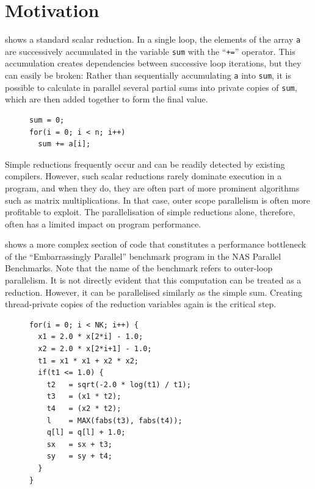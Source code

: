 \section{Motivation}

     shows a standard scalar reduction.
    In a single loop, the elements of the array \texttt{a} are successively
    accumulated in the variable \texttt{sum} with the ``\texttt{+=}'' operator.
    This accumulation creates dependencies between successive loop iterations,
    but they can easily be broken:
    Rather than sequentially accumulating {\tt a} into {\tt sum}, it is possible
    to calculate in parallel several partial sums into private copies of
    \texttt{sum}, which are then added together to form the final value.

\begin{figure}[h]
\begin{lstlisting}[language=MyCpp,label={sum-figure},caption=
    {The most conventional example of a reduction is adding up all values in an
     array.
     The reduction operator ``{\tt+}'' {\it reduces} the array \texttt{a} to a
     single element -- the reduction variable {\tt sum}.\parfillskip=0pt}]
sum = 0;
for(i = 0; i < n; i++)
  sum += a[i];
\end{lstlisting}
\end{figure}

    Simple reductions frequently occur and can be readily detected by existing
    compilers.
    However, such scalar reductions rarely dominate execution in a program, and
    when they do, they are often part of more prominent algorithms such as
    matrix multiplications.
    In that case, outer scope parallelism is often more profitable to exploit.
    The parallelisation of simple reductions alone, therefore, often has a
    limited impact on program performance.

     shows a more complex section of code that
    constitutes a performance bottleneck of the ``Embarrassingly Parallel''
    benchmark program in the NAS Parallel Benchmarks.
    Note that the name of the benchmark refers to outer-loop parallelism.
    It is not directly evident that this computation can be treated as a
    reduction.
    However, it can be parallelised similarly as the simple sum.
    Creating thread-private copies of the reduction variables again is the
    critical step.

\begin{figure}[h]
\begin{lstlisting}[language=MyCpp,label={complex-reduction-figure},caption=
   {Example of ``complex reductions and histograms'' computation:
    The bottleneck from NAS Parallel Benchmarks can be parallelised as
    reductions by privatising variables \texttt{sx}, \texttt{sy}, \texttt{q[]}.
    \parfillskip=0pt}]
for(i = 0; i < NK; i++) {
  x1 = 2.0 * x[2*i] - 1.0;
  x2 = 2.0 * x[2*i+1] - 1.0;
  t1 = x1 * x1 + x2 * x2;
  if(t1 <= 1.0) {
    t2   = sqrt(-2.0 * log(t1) / t1);
    t3   = (x1 * t2);
    t4   = (x2 * t2);
    l    = MAX(fabs(t3), fabs(t4));
    q[l] = q[l] + 1.0;
    sx   = sx + t3;
    sy   = sy + t4;
  }
}
\end{lstlisting}
\end{figure}

